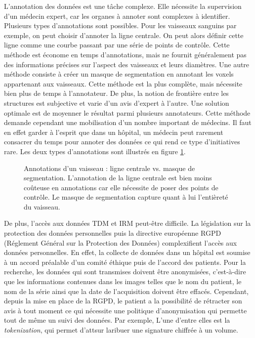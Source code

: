 L'annotation des données est une tâche complexe. Elle nécessite la supervision d'un médecin expert, car les organes à annoter sont complexes à identifier. Plusieurs types d'annotations sont possibles. Pour les vaisseaux sanguins par exemple, on peut choisir d'annoter la ligne centrale. On peut alors définir cette ligne comme une courbe passant par une série de points de contrôle. Cette méthode est économe en temps d'annotations, mais ne fournit généralement pas des informations précises sur l'aspect des vaisseaux et leurs diamètres. 
Une autre méthode consiste à créer un masque de segmentation en annotant les voxels appartenant aux vaisseaux. Cette méthode est la plus complète, mais nécessite bien plus de temps à l'annotateur. De plus, la notion de frontière entre les structures est subjective et varie d'un avis d'expert à l'autre. Une solution optimale est de moyenner le résultat parmi plusieurs annotateurs. Cette méthode demande cependant une mobilisation d'un nombre important de médecins. Il faut en effet garder à l'esprit que dans un hôpital, un médecin peut rarement consacrer du temps pour annoter des données ce qui rend ce type d'initiatives rare. Les deux types d'annotations sont illustrés en figure \ref{fig:annotations}. 

\begin{figure}
    \centering
    \caption{Annotations d'un vaisseau : ligne centrale vs. masque de segmentation. L'annotation de la ligne centrale est bien moins coûteuse en annotations car elle nécessite de poser des points de contrôle. Le masque de segmentation capture quant à lui l'entièreté du vaisseau.}
    \label{fig:annotations}
\end{figure}

De plus, l'accès aux données TDM et IRM peut-être difficile. La législation sur la protection des données personnelles puis la directive européenne RGPD (Réglement Général sur la Protection des Données) complexifient l'accès aux données personnelles. En effet, la collecte de données dans un hôpital est soumise à un accord préalable d'un comité éthique puis de l'accord des patients. Pour la recherche, les données qui sont transmises doivent être anonymisées, c'est-à-dire que les informations contenues dans les images telles que le nom du patient, le nom de la série ainsi que la date de l'acquisition doivent être effacés. Cependant, depuis la mise en place de la RGPD, le patient a la possibilité de rétracter son avis à tout moment ce qui nécessite une politique d'anonymisation qui permette tout de même un suivi des données. Par exemple, L'une d'entre elles est la \textit{tokenization}, qui permet d'attsur laribuer une signature chiffrée à un volume.

